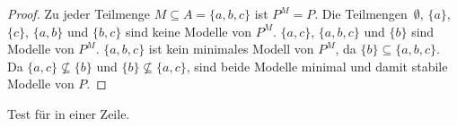 

\begin{proof}
    Zu jeder Teilmenge $M \subseteq A = \{ a, b, c \}$ ist $P^M = P$.
    Die Teilmengen~$\emptyset$, $\{ a \}$, $\{ c \}$, $\{ a, b \}$ und $\{ b, c \}$ sind keine Modelle von $P^M$. $\{ a, c \}$, $\{ a, b, c\}$ und $\{ b \}$ sind Modelle von $P^M$.
    $\{ a, b, c\}$ ist kein minimales Modell von $P^M$, da $\{ b \} \subseteq \{ a, b, c\}$.
    Da $\{ a, c \} \nsubseteq \{ b \}$ und $\{ b \} \nsubseteq \{ a, c \}$, sind beide Modelle minimal und damit stabile Modelle von $P$.
\end{proof}


Test für  in einer Zeile.

